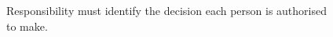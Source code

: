 \begin{figure}[H]
\centering
{}
\caption{Responsibility must identify the decision each person is authorised to make.}\label{fig:teach-M10-00}
\end{figure}
